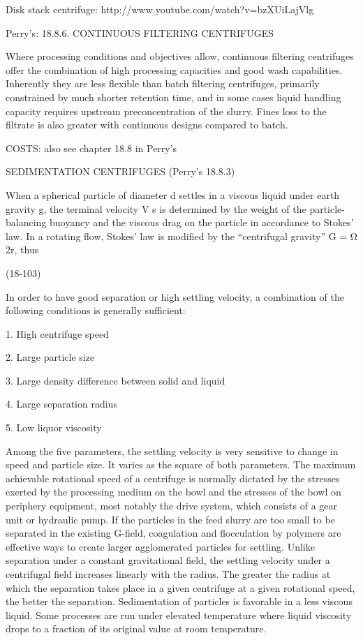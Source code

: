 Disk stack centrifuge: http://www.youtube.com/watch?v=bzXUiLajVlg

Perry's: 18.8.6. CONTINUOUS FILTERING CENTRIFUGES

Where processing conditions and objectives allow, continuous filtering centrifuges offer the combination of high processing capacities and good wash capabilities. Inherently they are less flexible than batch filtering centrifuges, primarily constrained by much shorter retention time, and in some cases liquid handling capacity requires upstream preconcentration of the slurry. Fines loss to the filtrate is also greater with continuous designs compared to batch.

COSTS: also see chapter 18.8 in Perry's


SEDIMENTATION CENTRIFUGES (Perry's 18.8.3)

When a spherical particle of diameter d settles in a viscous liquid under earth gravity g, the terminal velocity V s is determined by the weight of the particle-balancing buoyancy and the viscous drag on the particle in accordance to Stokes’ law. In a rotating flow, Stokes’ law is modified by the “centrifugal gravity” G = Ω 2r, thus

(18-103)

In order to have good separation or high settling velocity, a combination of the following conditions is generally sufficient:

1. High centrifuge speed

2. Large particle size

3. Large density difference between solid and liquid

4. Large separation radius

5. Low liquor viscosity

Among the five parameters, the settling velocity is very sensitive to change in speed and particle size. It varies as the square of both parameters. The maximum achievable rotational speed of a centrifuge is normally dictated by the stresses exerted by the processing medium on the bowl and the stresses of the bowl on periphery equipment, most notably the drive system, which consists of a gear unit or hydraulic pump. If the particles in the feed slurry are too small to be separated in the existing G-field, coagulation and flocculation by polymers are effective ways to create larger agglomerated particles for settling. Unlike separation under a constant gravitational field, the settling velocity under a centrifugal field increases linearly with the radius. The greater the radius at which the separation takes place in a given centrifuge at a given rotational speed, the better the separation. Sedimentation of particles is favorable in a less viscous liquid. Some processes are run under elevated temperature where liquid viscosity drops to a fraction of its original value at room temperature.

